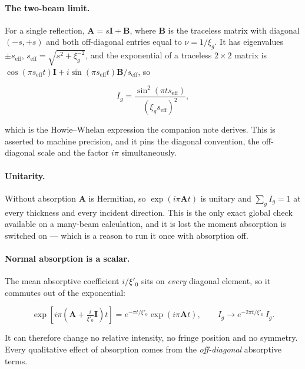 \paragraph{The two-beam limit.} For a single reflection, \(\mathbf{A} = s\mathbf{I} +
\mathbf{B}\), where \(\mathbf{B}\) is the traceless matrix with diagonal \((-s, +s)\) and
both off-diagonal entries equal to \(\nu = 1/\xi_{g}\). It has eigenvalues
\(\pm s_{\mathrm{eff}}\), \(s_{\mathrm{eff}} =
\sqrt{s^{2}+\xi_{g}^{-2}}\), and the exponential of a traceless \(2\times 2\) matrix is
\(\cos(\pi s_{\mathrm{eff}}t)\mathbf{I} + i\sin(\pi s_{\mathrm{eff}}t)\mathbf{B}/
s_{\mathrm{eff}}\), so

\begin{equation}
  I_{g} = \frac{\sin^{2}(\pi t s_{\mathrm{eff}})}{(\xi_{g}s_{\mathrm{eff}})^{2}},
\end{equation}

which is the Howie--Whelan expression the companion note derives. This is asserted to
machine precision, and it pins the diagonal convention, the off-diagonal scale and the
factor \(i\pi\) simultaneously.

\paragraph{Unitarity.} Without absorption \(\mathbf{A}\) is Hermitian, so
\(\exp(i\pi\mathbf{A}t)\) is unitary and \(\sum_{g}I_{g} = 1\) at every thickness and every
incident direction. This is the only exact global check available on a many-beam
calculation, and it is lost the moment absorption is switched on --- which is a reason to
run it once with absorption off.

\paragraph{Normal absorption is a scalar.} The mean absorptive coefficient
\(i/\xi'_{0}\) sits on \emph{every} diagonal element, so it commutes out of the exponential:

\begin{equation}
  \exp\left[i\pi\left(\mathbf{A} + \tfrac{i}{\xi'_{0}}\mathbf{I}\right)t\right]
    = e^{-\pi t/\xi'_{0}}\exp(i\pi\mathbf{A}t),
  \qquad
  I_{g} \to e^{-2\pi t/\xi'_{0}}\,I_{g}.
  \label{eq:dyn-normal}
\end{equation}

It can therefore change no relative intensity, no fringe position and no symmetry. Every
qualitative effect of absorption comes from the \emph{off-diagonal} absorptive terms.

